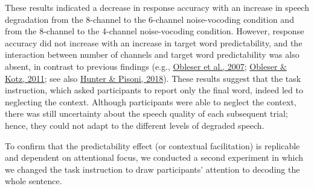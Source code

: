 \documentclass[a4paper, nobind]{templates/ociamthesis}
\begin{document}
These results indicated a decrease in response accuracy with an increase in speech degradation from the 8-channel to the 6-channel noise-vocoding condition and from the 8-channel to the 4-channel noise-vocoding condition.
However, response accuracy did not increase with an increase in target word predictability, and the interaction between number of channels and target word predictability was also absent,
in contrast to previous findings (e.g., \protect\hyperlink{ref-Obleser2007}{Obleser et al., 2007}; \protect\hyperlink{ref-Obleser2011}{Obleser \& Kotz, 2011}; see also \protect\hyperlink{ref-Hunter2018}{Hunter \& Pisoni, 2018}).
These results suggest that the task instruction, which asked participants to report only the final word, indeed led to neglecting the context.
Although participants were able to neglect the context, there was still uncertainty about the speech quality of each subsequent trial;
hence, they could not adapt to the different levels of degraded speech.

To confirm that the predictability effect (or contextual facilitation) is replicable and dependent on attentional focus, we conducted a second experiment in which we changed the task instruction to draw participants' attention to decoding the whole sentence.
\end{document}
